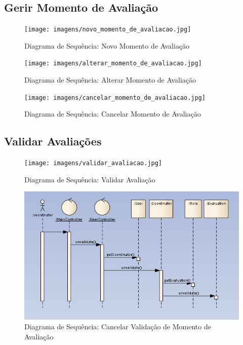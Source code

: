 \clearpage
\subsection{Gerir Momento de Avaliação}

\begin{figure}[!htbp]
\centering
\texttt{[image: imagens/novo\_momento\_de\_avaliacao.jpg]}
\caption{Diagrama de Sequência: Novo Momento de Avaliação}
\label{fig:novo_momento_de_avaliacao}
\end{figure}

\begin{figure}[!htbp]
\centering
\texttt{[image: imagens/alterar\_momento\_de\_avaliacao.jpg]}
\caption{Diagrama de Sequência: Alterar Momento de Avaliação}
\label{fig:alterar_momento_de_avaliacao}
\end{figure}

\begin{figure}[!htbp]
\centering
\texttt{[image: imagens/cancelar\_momento\_de\_avaliacao.jpg]}
\caption{Diagrama de Sequência: Cancelar Momento de Avaliação}
\label{fig:cancelar_momento_de_avaliacao}
\end{figure}


\clearpage
\subsection{Validar Avaliações}

\begin{figure}[!htbp]
\centering
\texttt{[image: imagens/validar\_avaliacao.jpg]}
\caption{Diagrama de Sequência: Validar Avaliação}
\label{fig:validar_avaliacao}
\end{figure}

\begin{figure}[!htbp]
\centering
\includegraphics{imagens/cancelar_validacao.jpg}
\caption{Diagrama de Sequência: Cancelar Validação de Momento de Avaliação}
\label{fig:cancelar_validacao}
\end{figure}

